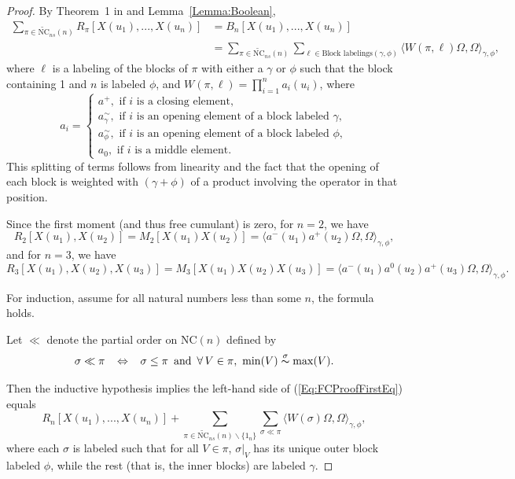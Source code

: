 \documentclass[12pt]{amsart}
\theoremstyle{definition}
\begin{document}
\begin{proof}
By Theorem~1 in \cite{Belinschi-Nica-Eta} and Lemma~\ref{Lemma:Boolean},
\begin{equation}
\label{Eq:FCProofFirstEq}
\begin{split}
\sum_{\pi\in\widetilde{\mathrm{NC}}_{ns}(n)} R_\pi [X(u_1),...,X(u_n)]
& = B_n [X(u_1),...,X(u_n)] \\
& = \sum_{\pi\in\widetilde{\mathrm{NC}}_{ns}(n)} \sum_{\ell\in\text{Block labelings}(\gamma,\phi)} \langle  W(\pi,\ell)\Omega , \Omega\rangle_{\gamma,\phi},
\end{split}
\end{equation}
where $\ell$ is a labeling of the blocks of $\pi$ with either a $\gamma$ or $\phi$ such that the block containing 1 and $n$ is labeled $\phi$, and $W(\pi,\ell) = \prod_{i=1}^n a_i(u_i)$, where
\begin{equation*}
a_i = \begin{cases}
a^+, \text{ if }i\text{ is a closing element,} \\
a_\gamma^\sim, \text{ if }i\text{ is an opening element of a block labeled }\gamma , \\
a_\phi^\sim, \text{ if }i\text{ is an opening element of a block labeled }\phi , \\
a_0, \text{ if }i\text{ is a middle element.}
\end{cases}
\end{equation*}
This splitting of terms follows from linearity and the fact that the opening of each block is weighted with $(\gamma + \phi)$ of a product involving the operator in that position.

Since the first moment (and thus free cumulant) is zero, for $n=2$, we have
\[R_2[X(u_1),X(u_2)] = M_2[X(u_1)X(u_2)] = \langle a^-(u_1)a^+(u_2)\Omega , \Omega\rangle_{\gamma,\phi},\] and for $n=3$, we have
\[R_3[X(u_1),X(u_2),X(u_3)] = M_3[X(u_1)X(u_2)X(u_3)] = \langle a^-(u_1)a^0(u_2)a^+(u_3)\Omega , \Omega\rangle_{\gamma,\phi}.\]

For induction, assume for all natural numbers less than some $n$, the formula holds.

Let $\ll$ denote the partial order on NC$(n)$ defined by
\begin{equation*}
\sigma \ll \pi \,\,\,\,\, \Leftrightarrow \,\,\,\,\, \sigma \leq \pi \,\text{ and }\, \forall\, V\in\pi , \,\, \min(V) \overset{\sigma}{\thicksim} \max(V).
\end{equation*}

Then the inductive hypothesis implies the left-hand side of (\ref{Eq:FCProofFirstEq}) equals
\begin{equation*}
R_n[X(u_1),...,X(u_n)] + \sum_{\pi\in\widetilde{\mathrm{NC}}_{ns}(n) \backslash \{1_n\}} \sum_{\sigma \ll \pi} \langle W(\sigma)\Omega , \Omega \rangle_{\gamma,\phi},
\end{equation*}
where each $\sigma$ is labeled such that for all $V\in\pi$, $\sigma |_V$ has its unique outer block labeled $\phi$, while the rest (that is, the inner blocks) are labeled $\gamma$.


\end{proof}
\end{document}
